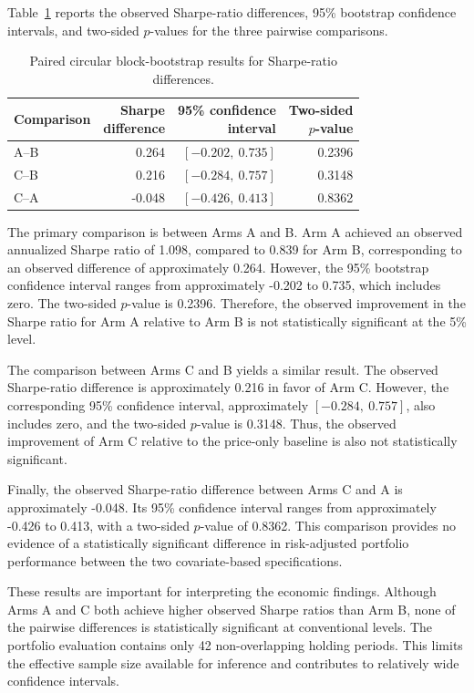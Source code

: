 \documentclass[12pt,a4paper,twoside,openany]{book}
\begin{document}
Table~\ref{tab:bootstrap-results} reports the observed Sharpe-ratio
differences, 95\% bootstrap confidence intervals, and two-sided
\(p\)-values for the three pairwise comparisons.

\begin{table}[htbp]
\centering
\caption{Paired circular block-bootstrap results for Sharpe-ratio
differences.}
\label{tab:bootstrap-results}
\small
\begin{tabular}{lrrr}
\toprule
Comparison &
\shortstack{Sharpe\\difference} &
\shortstack{95\% confidence\\interval} &
\shortstack{Two-sided\\\(p\)-value} \\
\midrule
A--B &  0.264 & $[-0.202,\ 0.735]$ & 0.2396 \\
C--B &  0.216 & $[-0.284,\ 0.757]$ & 0.3148 \\
C--A & -0.048 & $[-0.426,\ 0.413]$ & 0.8362 \\
\bottomrule
\end{tabular}
\end{table}

The primary comparison is between Arms A and B. Arm A achieved an observed
annualized Sharpe ratio of 1.098, compared to 0.839 for Arm B,
corresponding to an observed difference of approximately 0.264.
However, the 95\% bootstrap confidence interval ranges from
approximately -0.202 to 0.735, which includes zero. The
two-sided \(p\)-value is 0.2396. Therefore, the observed improvement
in the Sharpe ratio for Arm A relative to Arm B is not statistically
significant at the 5\% level.

The comparison between Arms C and B yields a similar result. The
observed Sharpe-ratio difference is approximately 0.216 in favor of
Arm C. However, the corresponding 95\% confidence interval,
approximately \([-0.284,\ 0.757]\), also includes zero, and the
two-sided \(p\)-value is 0.3148. Thus, the observed improvement of
Arm C relative to the price-only baseline is also not statistically
significant.

Finally, the observed Sharpe-ratio difference between Arms C and A is
approximately -0.048. Its 95\% confidence interval ranges from
approximately -0.426 to 0.413, with a two-sided \(p\)-value of 0.8362.
This comparison provides no evidence of a statistically significant
difference in risk-adjusted portfolio performance between the two
covariate-based specifications.

These results are important for interpreting the economic findings.
Although Arms A and C both achieve higher observed Sharpe ratios than
Arm B, none of the pairwise differences is statistically significant
at conventional levels. The portfolio evaluation contains only 42
non-overlapping holding periods. This limits the effective sample size
available for inference and contributes to relatively wide confidence
intervals.
\end{document}
